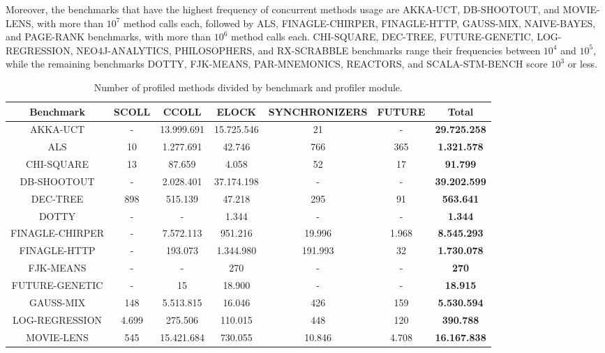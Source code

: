 \documentclass[]{usiinfthesis}
\begin{document}
Moreover, the benchmarks that have the highest frequency of concurrent methods usage are AKKA-UCT, DB-SHOOTOUT, and MOVIE-LENS, with more than \(10^7\) method calls each, followed by ALS, FINAGLE-CHIRPER, FINAGLE-HTTP, GAUSS-MIX, NAIVE-BAYES, and PAGE-RANK benchmarks, with more than \(10^6\) method calls each. CHI-SQUARE, DEC-TREE, FUTURE-GENETIC, LOG-REGRESSION, NEO4J-ANALYTICS, PHILOSOPHERS, and RX-SCRABBLE benchmarks range their frequencies between \(10^4\) and \(10^5\), while the remaining benchmarks DOTTY, FJK-MEANS, PAR-MNEMONICS, REACTORS, and SCALA-STM-BENCH score \(10^3\) or less. 


\begin{table}
\centering
\caption{Number of profiled methods divided by benchmark and profiler module.}
{\scriptsize
\begin{tabular}{|c|c|c|c|c|c||c|}
\hline
\textbf{Benchmark}	&	\textbf{SCOLL}	&	\textbf{CCOLL}	&	\textbf{ELOCK}	&	\textbf{SYNCHRONIZERS}	&	\textbf{FUTURE}	& \textbf{Total} \\ 
\hline
AKKA-UCT	&	 -   	&	 13.999.691 	&	 15.725.546 	&	 21 	&	 -   	&	 \textbf{29.725.258} 	 \\ 
ALS	&	 10 	&	 1.277.691 	&	 42.746 	&	 766 	&	 365 	&	 \textbf{1.321.578} 	 \\ 
CHI-SQUARE	&	 13 	&	 87.659 	&	 4.058 	&	 52 	&	 17 	&	 \textbf{91.799} 	 \\ 
DB-SHOOTOUT	&	 -   	&	 2.028.401 	&	 37.174.198 	&	 -   	&	 -   	&	 \textbf{39.202.599} 	 \\ 
DEC-TREE	&	 898 	&	 515.139 	&	 47.218 	&	 295 	&	 91 	&	 \textbf{563.641} 	 \\ 
DOTTY	&	 -   	&	 - 	&	 1.344 	&	 -   	&	 -   	&	 \textbf{1.344} 	 \\ 
FINAGLE-CHIRPER	&	 -   	&	 7.572.113 	&	 951.216 	&	 19.996 	&	 1.968 	&	 \textbf{8.545.293} 	 \\ 
FINAGLE-HTTP	&	 -   	&	 193.073 	&	 1.344.980 	&	 191.993 	&	 32 	&	\textbf{ 1.730.078} 	 \\ 
FJK-MEANS	&	 -   	&	 - 	&	 270 	&	 -   	&	 -   	&	 \textbf{270} 	 \\ 
FUTURE-GENETIC	&	 -   	&	 15 	&	 18.900 	&	 -   	&	 -   	&	 \textbf{18.915} 	 \\ 
GAUSS-MIX	&	 148 	&	 5.513.815 	&	 16.046 	&	 426 	&	 159 	&	 \textbf{5.530.594} 	 \\ 
LOG-REGRESSION	&	 4.699 	&	 275.506 	&	 110.015 	&	 448 	&	 120 	&	 \textbf{390.788} 	 \\ 
MOVIE-LENS	&	 545 	&	 15.421.684 	&	 730.055 	&	 10.846 	&	 4.708 	&	\textbf{ 16.167.838} 	 \\ 

\end{tabular}}
\end{table}
\end{document}
